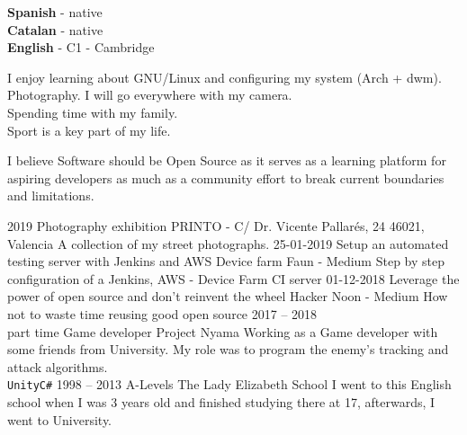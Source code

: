 \documentclass[9pt]{developercv} %
\begin{document}
\begin{minipage}[t]{0.3\textwidth}
	\vspace{-\baselineskip} %

	
	\textbf{Spanish} - native\\
	\textbf{Catalan} - native\\
	\textbf{English} - C1 - Cambridge
\end{minipage}
\hfill
\begin{minipage}[t]{0.3\textwidth}
	\vspace{-\baselineskip} %
	

	I enjoy learning about GNU/Linux and configuring my system (Arch + dwm).\\
	Photography. I will go everywhere with my camera.\\
	Spending time with my family.\\
	Sport is a key part of my life.\\
\end{minipage}
\hfill
\begin{minipage}[t]{0.3\textwidth}
	\vspace{-\baselineskip} %
	

	I believe Software should be Open Source as it serves as a learning platform for aspiring developers as much as a community effort to break current boundaries and limitations.
\end{minipage}



\begin{entrylist}
	\entry
	  {2019}
    	  {Photography exhibition}
    	  {PRINTO - C/ Dr. Vicente Pallarés, 24 46021, Valencia}
    	  {A collection of my street photographs.}
  	\entry
          {25-01-2019}
	  {Setup an automated testing server with Jenkins and AWS Device farm}
          {Faun - Medium}
          {Step by step configuration of a Jenkins, AWS - Device Farm CI server}
	\entry
          {01-12-2018}
	  {Leverage the power of open source and don’t reinvent the wheel}
	  {Hacker Noon - Medium}
          {How not to waste time reusing good open source}
	\entry
	  {2017 -- 2018\\\footnotesize{part time}}
	  {Game developer}
	  {Project Nyama}
	  {Working as a Game developer with some friends from University.
	  My role was to program the enemy's tracking and attack algorithms.\\ \texttt{Unity}\slashsep\texttt{C\#}}
	\entry
	  {1998 -- 2013}
	  {A-Levels}
	  {The Lady Elizabeth School}
	  {I went to this English school when I was 3 years old and finished studying there at 17, afterwards, I went to University.}
\end{entrylist}
\end{document}
